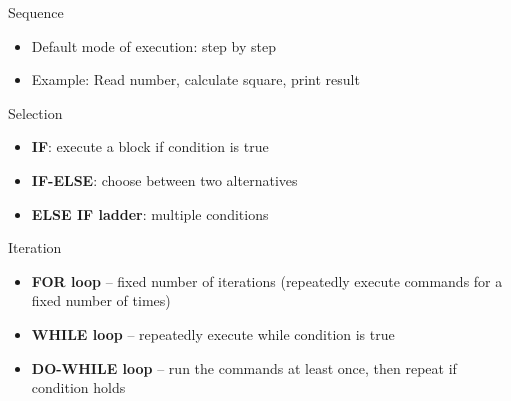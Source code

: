 \documentclass[12pt, aspectratio=169]{beamer}
\begin{document}
    \begin{frame}{Sequence}
        \begin{itemize}
            \item Default mode of execution: step by step
            \item Example: Read number, calculate square, print result
        \end{itemize}
    \end{frame}


    \begin{frame}{Selection}
        \begin{itemize}
            \item \textbf{IF}: execute a block if condition is true
            \item \textbf{IF-ELSE}: choose between two alternatives
            \item \textbf{ELSE IF ladder}: multiple conditions
        \end{itemize}
    \end{frame}


    \begin{frame}{Iteration}
        \begin{itemize}
            \item \textbf{FOR loop} – fixed number of iterations (repeatedly execute commands for a fixed number of times)
            \item \textbf{WHILE loop} – repeatedly execute while condition is true
            \item \textbf{DO-WHILE loop} – run the commands at least once, then repeat if condition holds
        \end{itemize}
    \end{frame}


\end{document}
